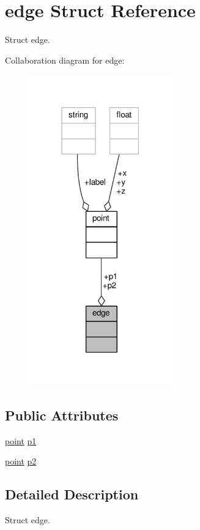 \hypertarget{structedge}{}\section{edge Struct Reference}
\label{structedge}


Struct edge.  




Collaboration diagram for edge\+:
\nopagebreak
\begin{figure}[H]
\begin{center}
\leavevmode
\includegraphics[width=174pt]{structedge__coll__graph}
\end{center}
\end{figure}
\subsection*{Public Attributes}
\begin{DoxyCompactItemize}
\item 
\hyperlink{structpoint}{point} \hyperlink{structedge_a7b074374ee3059d29a93e9e76480274e}{p1}
\item 
\hyperlink{structpoint}{point} \hyperlink{structedge_a105ba74e7b01aba7e0e113ab286dc883}{p2}
\end{DoxyCompactItemize}


\subsection{Detailed Description}
Struct edge. 

